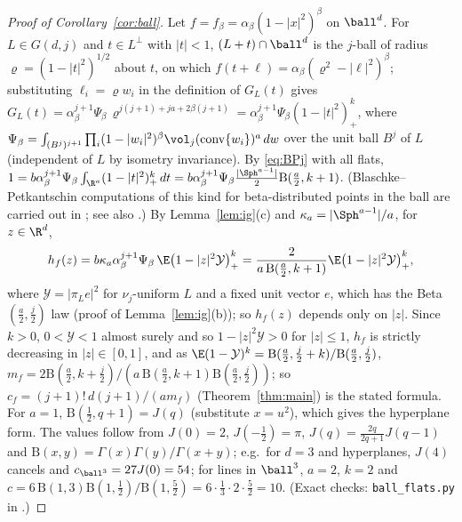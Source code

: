 \begin{proof}[Proof of Corollary~\ref{cor:ball}]
Let $f=f_\beta=\alpha_\beta(1-|x|^2)^\beta$ on $\ball^d$. For $L\in G(d,j)$ and $t\in L^\perp$ with $|t|<1$, $(L+t)\cap\ball^d$ is the $j$-ball of
radius $\varrho=(1-|t|^2)^{1/2}$ about $t$, on which $f(t+\ell)=\alpha_\beta(\varrho^2-|\ell|^2)^\beta$; substituting $\ell_i=\varrho w_i$ in the
definition of $G_L(t)$ gives $G_L(t)=\alpha_\beta^{j+1}\Psi_\beta\,\varrho^{j(j+1)+ja+2\beta(j+1)}=\alpha_\beta^{j+1}\Psi_\beta(1-|t|^2)_+^{k}$, where
$\Psi_\beta=\int_{(B^j)^{j+1}}\prod_i(1-|w_i|^2)^\beta\vol_j(\operatorname{conv}\{w_i\})^a\,dw$ over the unit ball $B^j$ of $L$ (independent of $L$ by
isometry invariance). By \eqref{eq:BPj} with all flats, $1=b\alpha_\beta^{j+1}\Psi_\beta\int_{\R^a}(1-|t|^2)_+^k\,dt=b\alpha_\beta^{j+1}\Psi_\beta\frac{|\Sph^{a-1}|}2\mathrm B(\frac a2,k+1)$.
(Blaschke--Petkantschin computations of this kind for beta-distributed points in the ball are carried out in \cite{KTT};
see also \cite{RM}.) By Lemma~\ref{lem:ig}(c) and $\kappa_a=|\Sph^{a-1}|/a$, for $z\in\R^d$,
\[
  h_f(z)=b\kappa_a\alpha_\beta^{j+1}\Psi_\beta\,\E\bigl(1-|z|^2\mathcal Y\bigr)_+^k=\frac{2}{a\,\mathrm B(\frac a2,k+1)}\E\bigl(1-|z|^2\mathcal Y\bigr)_+^k,
\]
where $\mathcal Y=|\pi_Le|^2$ for $\nu_j$-uniform $L$ and a fixed unit vector $e$, which has the Beta$(\frac a2,\frac j2)$ law (proof of
Lemma~\ref{lem:ig}(b)); so $h_f(z)$ depends only on $|z|$. Since $k>0$, $0<\mathcal Y<1$ almost surely and so $1-|z|^2\mathcal Y>0$ for $|z|\le1$, $h_f$ is strictly decreasing in
$|z|\in[0,1]$, and as $\E(1-\mathcal Y)^k=\mathrm B(\frac a2,\frac j2+k)/\mathrm B(\frac a2,\frac j2)$,
$m_f=2\mathrm B(\frac a2,k+\frac j2)/(a\,\mathrm B(\frac a2,k+1)\mathrm B(\frac a2,\frac j2))$; so $c_f=(j+1)!\,d(j+1)/(am_f)$ (Theorem~\ref{thm:main}) is the
stated formula. For $a=1$, $\mathrm B(\frac12,q+1)=J(q)$ (substitute $x=u^2$), which gives the hyperplane form. The values follow
from $J(0)=2$, $J(-\frac12)=\pi$, $J(q)=\frac{2q}{2q+1}J(q-1)$ and $\mathrm B(x,y)=\Gamma(x)\Gamma(y)/\Gamma(x+y)$; e.g.\ for $d=3$ and
hyperplanes, $J(4)$ cancels and $c_{\ball^3}=27J(0)=54$; for lines in $\ball^3$, $a=2$, $k=2$ and
$c=6\,\mathrm B(1,3)\mathrm B(1,\frac12)/\mathrm B(1,\frac52)=6\cdot\frac13\cdot2\cdot\frac52=10$. (Exact checks: \texttt{ball\_flats.py} in \cite{Repo}.)
\end{proof}

